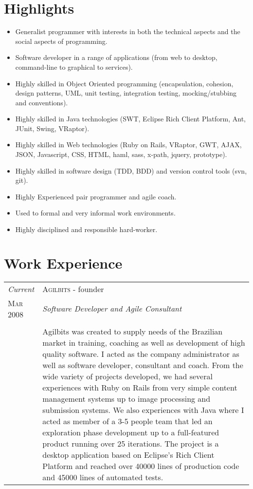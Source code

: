 \documentclass[letter,10pt]{article}
\begin{document}
\section{Highlights}

\begin{itemize}
\item Generalist programmer with interests in both the technical
  aspects and the social aspects of programming.
\item Software developer in a range of applications (from web to
  desktop, command-line to graphical to services).
\item Highly skilled in Object Oriented programming (encapsulation,
  cohesion, design patterns, UML, unit testing, integration testing,
  mocking/stubbing and conventions).
\item Highly skilled in Java technologies (SWT, Eclipse Rich Client
  Platform, Ant, JUnit, Swing, VRaptor).
\item Highly skilled in Web technologies (Ruby on Rails, VRaptor, GWT,
  AJAX, JSON, Javascript, CSS, HTML, haml, sass, x-path, jquery,
  prototype).
\item Highly skilled in software design (TDD, BDD) and version control
  tools (svn, git).
\item Highly Experienced pair programmer and agile coach.
\item Used to formal and very informal work environments.
\item Highly disciplined and responsible hard-worker.
\end{itemize}

\section{Work Experience}

\begin{tabular}{p{2.5cm}|p{13.5cm}}
  \emph{Current} & \textsc{Agilbits} - founder\\
  \textsc{Mar 2008}& \emph{Software Developer and Agile Consultant}\\
  &\\
  &Agilbits was created
  to supply needs of the Brazilian market in training, coaching as
  well as development of high quality software. I acted as the
  company administrator as well as software developer, consultant
  and coach.
  From the wide variety of projects developed, we had several
  experiences with Ruby on Rails from very simple content management
  systems up to image processing and submission systems.
  We also experiences with Java where I acted as member of a 3-5
  people team that led an exploration phase development up to a
  full-featured product running over 25 iterations. The project is a
  desktop application based on Eclipse's Rich Client Platform and
  reached over 40000 lines of production code and 45000 lines of
  automated tests.
\end{tabular}
\end{document}

